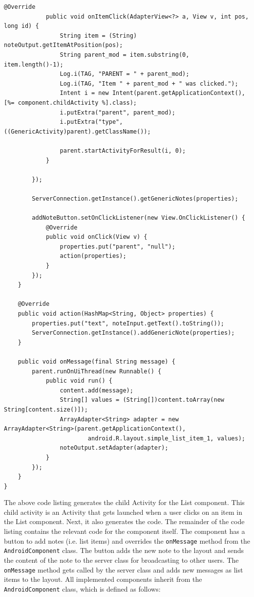 \begin{lstlisting}[label=codegen-list,caption=Android List Component code-generation, captionpos=t]
			@Override
			public void onItemClick(AdapterView<?> a, View v, int pos, long id) {
				String item = (String) noteOutput.getItemAtPosition(pos);
				String parent_mod = item.substring(0, item.length()-1);
				Log.i(TAG, "PARENT = " + parent_mod);
				Log.i(TAG, "Item " + parent_mod + " was clicked.");
				Intent i = new Intent(parent.getApplicationContext(), [%= component.childActivity %].class);
				i.putExtra("parent", parent_mod);
				i.putExtra("type", ((GenericActivity)parent).getClassName());
				
				parent.startActivityForResult(i, 0);
			}
			
		});
		
		ServerConnection.getInstance().getGenericNotes(properties);
		
		addNoteButton.setOnClickListener(new View.OnClickListener() {
			@Override
			public void onClick(View v) {
				properties.put("parent", "null");
				action(properties);
			}
		});
	}
	
	@Override
	public void action(HashMap<String, Object> properties) {
		properties.put("text", noteInput.getText().toString());
		ServerConnection.getInstance().addGenericNote(properties);
	}

	public void onMessage(final String message) {
		parent.runOnUiThread(new Runnable() {
			public void run() {
				content.add(message);
				String[] values = (String[])content.toArray(new String[content.size()]);
				ArrayAdapter<String> adapter = new ArrayAdapter<String>(parent.getApplicationContext(),
						android.R.layout.simple_list_item_1, values);
				noteOutput.setAdapter(adapter);
			}
		});
	}
}
\end{lstlisting}
The above code listing generates the child Activity for the List component. This child activity is an Activity that gets launched when a user clicks on an item in the List component. Next, it also generates the code. The remainder of the code listing contains the relevant code for the component itself. The component has a button to add notes (i.e. list items) and overrides the \texttt{onMessage} method from the \texttt{AndroidComponent} class. The button adds the new note to the layout and sends the content of the note to the server class for broadcasting to other users. The \texttt{onMessage} method gets called by the server class and adds new messages as list items to the layout. All implemented components inherit from the \texttt{AndroidComponent} class, which is defined as follows:
